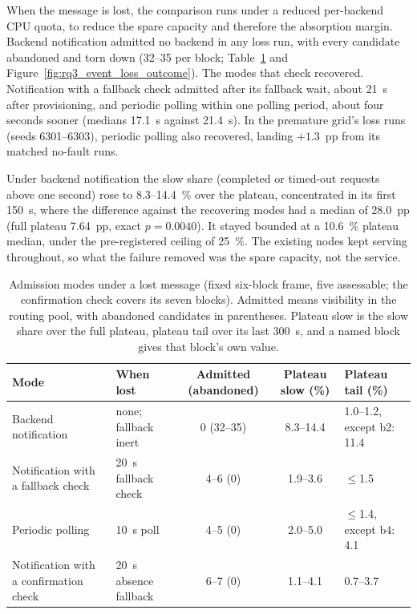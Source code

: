 ﻿\documentclass[12pt,reqno,twoside]{amsbook}
\begin{document}
When the message is lost, the comparison runs under a reduced
per-backend CPU quota, to reduce the spare capacity and therefore the
absorption margin. Backend notification admitted no backend in any loss
run, with every candidate abandoned and torn down (32--35 per block;
Table~\ref{tab:rq3_fault} and Figure~\ref{fig:rq3_event_loss_outcome}).
The modes that check recovered. Notification with a fallback check admitted 
after its fallback wait, about 21~s after provisioning, and periodic polling
within one polling period, about four seconds sooner (medians 17.1~s
against 21.4~s). In the premature grid's loss runs (seeds 6301--6303),
periodic polling also recovered, landing $+1.3$~pp from its matched
no-fault runs.

Under backend notification the slow share (completed or timed-out requests
above one second) rose to 8.3--14.4~\% over the plateau, concentrated in its
first 150~s, where the difference against the recovering modes had a median of
28.0~pp (full plateau 7.64~pp, exact $p = 0.0040$). It stayed bounded at a
10.6~\% plateau median, under the pre-registered ceiling of 25~\%. The existing
nodes kept serving throughout, so what the failure removed was the spare
capacity, not the service.

\begin{table}[H]
    \centering
    \caption{Admission modes under a lost message (fixed six-block frame, five
    assessable; the confirmation check covers its seven blocks). Admitted means
    visibility in the routing pool, with abandoned candidates in parentheses.
    Plateau slow is the slow share over the full plateau, plateau tail over its
    last 300~s, and a named block gives that block's own value.}
    \label{tab:rq3_fault}
    \footnotesize
    \setlength{\tabcolsep}{2pt}
    \begin{tabular}{p{} p{} c c p{}}
        \toprule
        Mode & When lost & Admitted (abandoned) & Plateau slow (\%) & Plateau tail (\%) \\
        \midrule
        Backend notification & none; fallback inert & 0 (32--35) & 8.3--14.4 & 1.0--1.2, except b2: 11.4 \\
        Notification with a fallback check & 20~s fallback check & 4--6 (0) & 1.9--3.6 & $\le$1.5 \\
        Periodic polling & 10~s poll & 4--5 (0) & 2.0--5.0 & $\le$1.4, except b4: 4.1 \\
        Notification with a confirmation check & 20~s absence fallback & 6--7 (0) & 1.1--4.1 & 0.7--3.7 \\
        \bottomrule
    \end{tabular}
\end{table}
\end{document}
